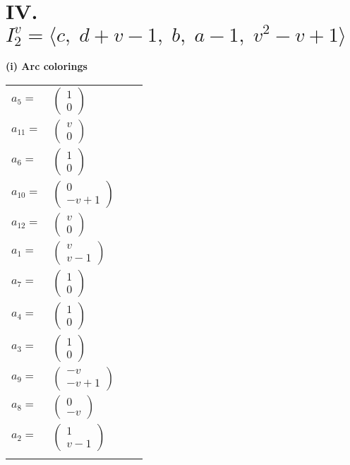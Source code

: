 \documentclass[1p]{elsarticle_modified}
\theoremstyle{definition}
\begin{document}
\centering \section*{IV. $I^v_{2}= \langle c,\;d+v-1,\;b,\;a-1,\;v^2- v+1 \rangle$}
\flushleft \textbf{(i) Arc colorings}\\
\begin{tabular}{m{7pt} m{180pt} m{7pt} m{180pt} }
\flushright $a_{5}=$&$\begin{pmatrix}1\\0\end{pmatrix}$ \\
\flushright $a_{11}=$&$\begin{pmatrix}v\\0\end{pmatrix}$ \\
\flushright $a_{6}=$&$\begin{pmatrix}1\\0\end{pmatrix}$ \\
\flushright $a_{10}=$&$\begin{pmatrix}0\\- v+1\end{pmatrix}$ \\
\flushright $a_{12}=$&$\begin{pmatrix}v\\0\end{pmatrix}$ \\
\flushright $a_{1}=$&$\begin{pmatrix}v\\v-1\end{pmatrix}$ \\
\flushright $a_{7}=$&$\begin{pmatrix}1\\0\end{pmatrix}$ \\
\flushright $a_{4}=$&$\begin{pmatrix}1\\0\end{pmatrix}$ \\
\flushright $a_{3}=$&$\begin{pmatrix}1\\0\end{pmatrix}$ \\
\flushright $a_{9}=$&$\begin{pmatrix}- v\\- v+1\end{pmatrix}$ \\
\flushright $a_{8}=$&$\begin{pmatrix}0\\- v\end{pmatrix}$ \\
\flushright $a_{2}=$&$\begin{pmatrix}1\\v-1\end{pmatrix}$\\&\end{tabular}
\end{document}
